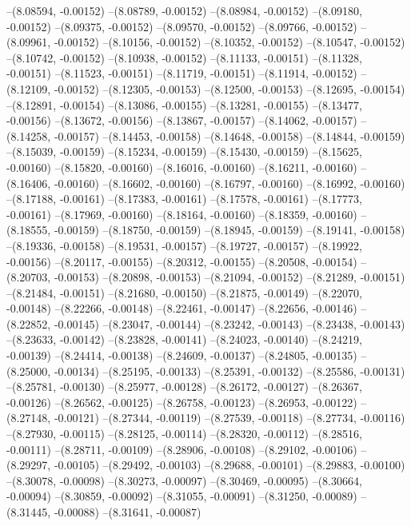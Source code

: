 --(8.08594, -0.00152)
--(8.08789, -0.00152)
--(8.08984, -0.00152)
--(8.09180, -0.00152)
--(8.09375, -0.00152)
--(8.09570, -0.00152)
--(8.09766, -0.00152)
--(8.09961, -0.00152)
--(8.10156, -0.00152)
--(8.10352, -0.00152)
--(8.10547, -0.00152)
--(8.10742, -0.00152)
--(8.10938, -0.00152)
--(8.11133, -0.00151)
--(8.11328, -0.00151)
--(8.11523, -0.00151)
--(8.11719, -0.00151)
--(8.11914, -0.00152)
--(8.12109, -0.00152)
--(8.12305, -0.00153)
--(8.12500, -0.00153)
--(8.12695, -0.00154)
--(8.12891, -0.00154)
--(8.13086, -0.00155)
--(8.13281, -0.00155)
--(8.13477, -0.00156)
--(8.13672, -0.00156)
--(8.13867, -0.00157)
--(8.14062, -0.00157)
--(8.14258, -0.00157)
--(8.14453, -0.00158)
--(8.14648, -0.00158)
--(8.14844, -0.00159)
--(8.15039, -0.00159)
--(8.15234, -0.00159)
--(8.15430, -0.00159)
--(8.15625, -0.00160)
--(8.15820, -0.00160)
--(8.16016, -0.00160)
--(8.16211, -0.00160)
--(8.16406, -0.00160)
--(8.16602, -0.00160)
--(8.16797, -0.00160)
--(8.16992, -0.00160)
--(8.17188, -0.00161)
--(8.17383, -0.00161)
--(8.17578, -0.00161)
--(8.17773, -0.00161)
--(8.17969, -0.00160)
--(8.18164, -0.00160)
--(8.18359, -0.00160)
--(8.18555, -0.00159)
--(8.18750, -0.00159)
--(8.18945, -0.00159)
--(8.19141, -0.00158)
--(8.19336, -0.00158)
--(8.19531, -0.00157)
--(8.19727, -0.00157)
--(8.19922, -0.00156)
--(8.20117, -0.00155)
--(8.20312, -0.00155)
--(8.20508, -0.00154)
--(8.20703, -0.00153)
--(8.20898, -0.00153)
--(8.21094, -0.00152)
--(8.21289, -0.00151)
--(8.21484, -0.00151)
--(8.21680, -0.00150)
--(8.21875, -0.00149)
--(8.22070, -0.00148)
--(8.22266, -0.00148)
--(8.22461, -0.00147)
--(8.22656, -0.00146)
--(8.22852, -0.00145)
--(8.23047, -0.00144)
--(8.23242, -0.00143)
--(8.23438, -0.00143)
--(8.23633, -0.00142)
--(8.23828, -0.00141)
--(8.24023, -0.00140)
--(8.24219, -0.00139)
--(8.24414, -0.00138)
--(8.24609, -0.00137)
--(8.24805, -0.00135)
--(8.25000, -0.00134)
--(8.25195, -0.00133)
--(8.25391, -0.00132)
--(8.25586, -0.00131)
--(8.25781, -0.00130)
--(8.25977, -0.00128)
--(8.26172, -0.00127)
--(8.26367, -0.00126)
--(8.26562, -0.00125)
--(8.26758, -0.00123)
--(8.26953, -0.00122)
--(8.27148, -0.00121)
--(8.27344, -0.00119)
--(8.27539, -0.00118)
--(8.27734, -0.00116)
--(8.27930, -0.00115)
--(8.28125, -0.00114)
--(8.28320, -0.00112)
--(8.28516, -0.00111)
--(8.28711, -0.00109)
--(8.28906, -0.00108)
--(8.29102, -0.00106)
--(8.29297, -0.00105)
--(8.29492, -0.00103)
--(8.29688, -0.00101)
--(8.29883, -0.00100)
--(8.30078, -0.00098)
--(8.30273, -0.00097)
--(8.30469, -0.00095)
--(8.30664, -0.00094)
--(8.30859, -0.00092)
--(8.31055, -0.00091)
--(8.31250, -0.00089)
--(8.31445, -0.00088)
--(8.31641, -0.00087)
